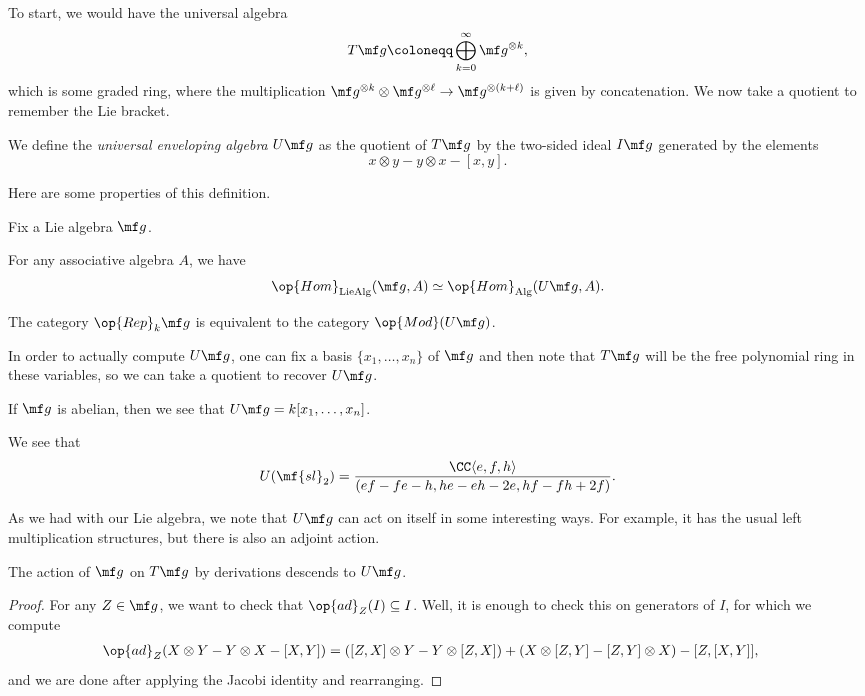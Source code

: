 \documentclass[../notes.tex]{subfiles}
\begin{document}
To start, we would have the universal algebra
\[T\mf g\coloneqq\bigoplus_{k=0}^\infty\mf g^{\otimes k},\]
which is some graded ring, where the multiplication $\mf g^{\otimes k}\otimes\mf g^{\otimes\ell}\to\mf g^{\otimes(k+\ell)}$ is given by concatenation. We now take a quotient to remember the Lie bracket.
\begin{definition}
	We define the \textit{universal enveloping algebra} $U\mf g$ as the quotient of $T\mf g$ by the two-sided ideal $I\mf g$ generated by the elements
	\[x\otimes y-y\otimes x-[x,y].\]
\end{definition}
Here are some properties of this definition.
\begin{proposition}
	Fix a Lie algebra $\mf g$.
	\begin{listalph}
		\item For any associative algebra $A$, we have
		\[\op{Hom}_{\mathrm{LieAlg}}(\mf g,A)\simeq\op{Hom}_{\mathrm{Alg}}(U\mf g,A).\]
		\item The category $\op{Rep}_k\mf g$ is equivalent to the category $\op{Mod}(U\mf g)$.
	\end{listalph}
\end{proposition}
In order to actually compute $U\mf g$, one can fix a basis $\{x_1,\ldots,x_n\}$ of $\mf g$ and then note that $T\mf g$ will be the free polynomial ring in these variables, so we can take a quotient to recover $U\mf g$.
\begin{example}
	If $\mf g$ is abelian, then we see that $U\mf g=k[x_1,\ldots,x_n]$.
\end{example}
\begin{example}
	We see that
	\[U(\mf{sl}_2)=\frac{\CC\langle e,f,h\rangle}{(ef-fe-h,he-eh-2e,hf-fh+2f)}.\]
\end{example}
As we had with our Lie algebra, we note that $U\mf g$ can act on itself in some interesting ways. For example, it has the usual left multiplication structures, but there is also an adjoint action.
\begin{lemma}
	The action of $\mf g$ on $T\mf g$ by derivations descends to $U\mf g$.
\end{lemma}
\begin{proof}
	For any $Z\in\mf g$, we want to check that $\op{ad}_Z(I)\subseteq I$. Well, it is enough to check this on generators of $I$, for which we compute
	\begin{align*}
		\op{ad}_Z(X\otimes Y-Y\otimes X-[X,Y]) &= ([Z,X]\otimes Y-Y\otimes[Z,X])+(X\otimes[Z,Y]-[Z,Y]\otimes X)-[Z,[X,Y]],
	\end{align*}
	and we are done after applying the Jacobi identity and rearranging.
\end{proof}
\end{document}
